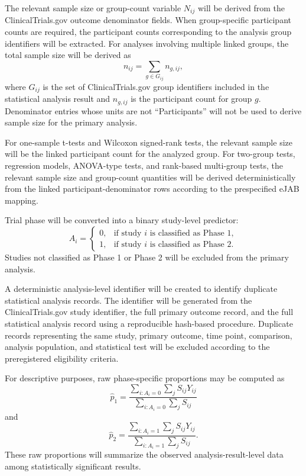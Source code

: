 \documentclass[11pt]{article}
\begin{document}
The relevant sample size or group-count variable \(N_{ij}\) will be derived from the ClinicalTrials.gov outcome denominator fields. When group-specific participant counts are required, the participant counts corresponding to the analysis group identifiers will be extracted. For analyses involving multiple linked groups, the total sample size will be derived as
\[
n_{ij} = \sum_{g \in G_{ij}} n_{g,ij},
\]
where \(G_{ij}\) is the set of ClinicalTrials.gov group identifiers included in the statistical analysis result and \(n_{g,ij}\) is the participant count for group \(g\). Denominator entries whose units are not ``Participants'' will not be used to derive sample size for the primary analysis.

For one-sample t-tests and Wilcoxon signed-rank tests, the relevant sample size will be the linked participant count for the analyzed group. For two-group tests, regression models, ANOVA-type tests, and rank-based multi-group tests, the relevant sample size and group-count quantities will be derived deterministically from the linked participant-denominator rows according to the prespecified eJAB mapping.

Trial phase will be converted into a binary study-level predictor:
\[
A_i =
\begin{cases}
0, & \text{if study } i \text{ is classified as Phase 1},\\
1, & \text{if study } i \text{ is classified as Phase 2}.
\end{cases}
\]
Studies not classified as Phase 1 or Phase 2 will be excluded from the primary analysis.

A deterministic analysis-level identifier will be created to identify duplicate statistical analysis records. The identifier will be generated from the ClinicalTrials.gov study identifier, the full primary outcome record, and the full statistical analysis record using a reproducible hash-based procedure. Duplicate records representing the same study, primary outcome, time point, comparison, analysis population, and statistical test will be excluded according to the preregistered eligibility criteria.

For descriptive purposes, raw phase-specific proportions may be computed as
\[
\hat{p}_1 =
\frac{\sum_{i:A_i=0}\sum_j S_{ij}Y_{ij}}{\sum_{i:A_i=0}\sum_j S_{ij}}
\]
and
\[
\hat{p}_2 =
\frac{\sum_{i:A_i=1}\sum_j S_{ij}Y_{ij}}{\sum_{i:A_i=1}\sum_j S_{ij}}.
\]
These raw proportions will summarize the observed analysis-result-level data among statistically significant results.
\end{document}
